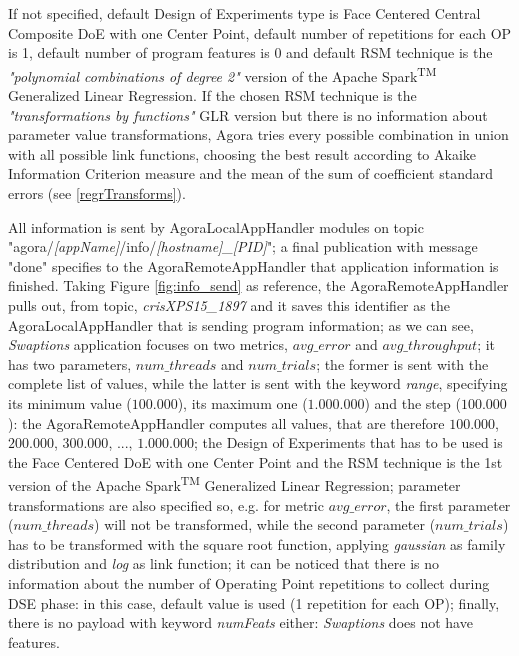 If not specified, default Design of Experiments type is Face Centered Central Composite DoE with one Center Point, default number of repetitions for each OP is 1, default number of program features is 0 and default RSM technique is the \textit{"polynomial combinations of degree 2"} version of the Apache Spark\textsuperscript{TM} Generalized Linear Regression. If the chosen RSM technique is the \textit{"transformations by functions"} GLR version but there is no information about parameter value transformations, Agora tries every possible combination in union with all possible link functions, choosing the best result according to Akaike Information Criterion measure and the mean of the sum of coefficient standard errors (see \ref{regrTransforms}).

All information is sent by AgoraLocalAppHandler modules on topic "agora\slash{}\textit{[appName]}\slash{}info\slash{}\textit{[hostname]\_[PID]}"; a final publication with message "done" specifies to the AgoraRemoteAppHandler that application information is finished. Taking Figure \ref{fig:info_send} as reference, the AgoraRemoteAppHandler pulls out, from topic, \textit{crisXPS15\_1897} and it saves this identifier as the AgoraLocalAppHandler that is sending program information; as we can see, \textit{Swaptions} application focuses on two metrics, $avg\_error$ and $avg\_throughput$; it has two parameters, $num\_threads$ and $num\_trials$; the former is sent with the complete list of values, while the latter is sent with the keyword \textit{range}, specifying its minimum value ($100.000$), its maximum one ($1.000.000$) and the step ($100.000$): the Agora\-Remote\-App\-Handler computes all values, that are therefore $100.000$, $200.000$, $300.000$, ..., $1.000.000$; the Design of Experiments that has to be used is the Face Centered DoE with one Center Point and the RSM technique is the 1st version of the Apache Spark\textsuperscript{TM} Generalized Linear Regression; parameter transformations are also specified so, e.g. for metric $avg\_error$, the first parameter ($num\_threads$) will not be transformed, while the second parameter ($num\_trials$) has to be transformed with the square root function, applying \textit{gaussian} as family distribution and \textit{log} as link function; it can be noticed that there is no information about the number of Operating Point repetitions to collect during DSE phase: in this case, default value is used (1 repetition for each OP); finally, there is no payload with keyword \textit{numFeats} either: \textit{Swaptions} does not have features.

